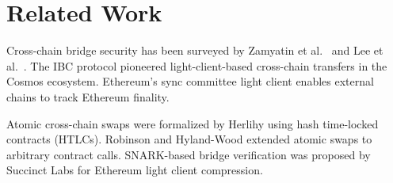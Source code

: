 \section{Related Work}
\label{sec:related}

Cross-chain bridge security has been surveyed by Zamyatin et al.\ \cite{zamyatin2021bridge} and Lee et al.\ \cite{lee2023bridge}. The IBC protocol \cite{goes2020ibc} pioneered light-client-based cross-chain transfers in the Cosmos ecosystem. Ethereum's sync committee light client \cite{ethereumlc2022} enables external chains to track Ethereum finality.

Atomic cross-chain swaps were formalized by Herlihy \cite{herlihy2018atomic} using hash time-locked contracts (HTLCs). Robinson and Hyland-Wood \cite{robinson2022crosschain} extended atomic swaps to arbitrary contract calls. SNARK-based bridge verification was proposed by Succinct Labs \cite{succinct2023} for Ethereum light client compression.

